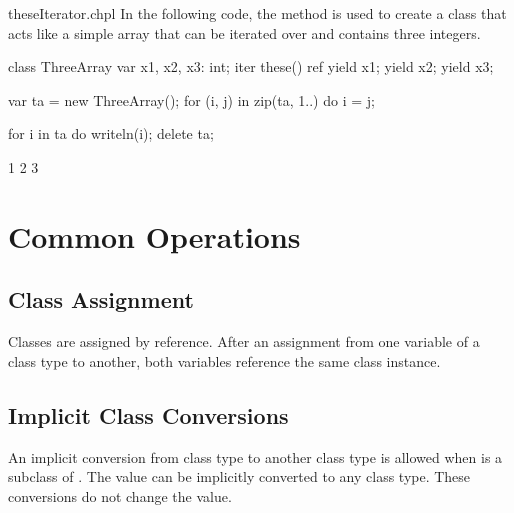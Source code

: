 \begin{chapelexample}{theseIterator.chpl}
In the following code, the  method is used to create a
class that acts like a simple array that can be iterated over and
contains three integers.
\begin{chapel}
class ThreeArray {
  var x1, x2, x3: int;
  iter these() ref {
    yield x1;
    yield x2;
    yield x3;
  }
}
\end{chapel}
\begin{chapelpost}
var ta = new ThreeArray();
for (i, j) in zip(ta, 1..) do
  i = j;

for i in ta do
  writeln(i);
delete ta;
\end{chapelpost}
\begin{chapeloutput}
1
2
3
\end{chapeloutput}

\end{chapelexample}

\section{Common Operations}

\subsection{Class Assignment}
\label{Class_Assignment}

Classes are assigned by reference.  After an assignment from one
variable of a class type to another, both variables reference the same
class instance.

\subsection{Implicit Class Conversions}
\label{Implicit_Class_Conversions}

An implicit conversion from class type  to
another class type  is allowed when  is a subclass
of .
The value  can be implicitly converted to any class type.
These conversions do not change the value.



